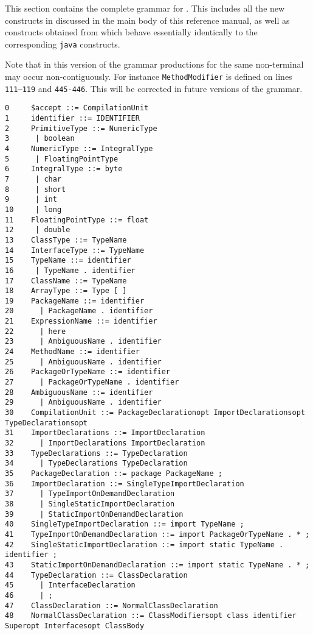 \onecolumn
{}\label{X10 syntax}

This section contains the complete grammar for \Xten{}. This includes
all the new constructs in \Xten{} discussed in the main body of this
reference manual, as well as constructs obtained from \java{} which
behave essentially identically to the corresponding {\tt java} constructs.

Note that in this version of the grammar productions for the same
non-terminal may occur non-contiguously. For instance 
{\tt MethodModifier} is defined on lines {\tt 111--119} and
{\tt 445-446}. This will be corrected in future versions of the grammar.

{\footnotesize
\begin{verbatim}
0     $accept ::= CompilationUnit
1     identifier ::= IDENTIFIER
2     PrimitiveType ::= NumericType
3      | boolean
4     NumericType ::= IntegralType
5      | FloatingPointType
6     IntegralType ::= byte
7      | char
8      | short
9      | int
10     | long
11    FloatingPointType ::= float
12     | double
13    ClassType ::= TypeName
14    InterfaceType ::= TypeName
15    TypeName ::= identifier
16     | TypeName . identifier
17    ClassName ::= TypeName
18    ArrayType ::= Type [ ]
19    PackageName ::= identifier
20      | PackageName . identifier
21    ExpressionName ::= identifier
22      | here
23      | AmbiguousName . identifier
24    MethodName ::= identifier
25      | AmbiguousName . identifier
26    PackageOrTypeName ::= identifier
27      | PackageOrTypeName . identifier
28    AmbiguousName ::= identifier
29      | AmbiguousName . identifier
30    CompilationUnit ::= PackageDeclarationopt ImportDeclarationsopt TypeDeclarationsopt
31    ImportDeclarations ::= ImportDeclaration
32      | ImportDeclarations ImportDeclaration
33    TypeDeclarations ::= TypeDeclaration
34      | TypeDeclarations TypeDeclaration
35    PackageDeclaration ::= package PackageName ;
36    ImportDeclaration ::= SingleTypeImportDeclaration
37      | TypeImportOnDemandDeclaration
38      | SingleStaticImportDeclaration
39      | StaticImportOnDemandDeclaration
40    SingleTypeImportDeclaration ::= import TypeName ;
41    TypeImportOnDemandDeclaration ::= import PackageOrTypeName . * ;
42    SingleStaticImportDeclaration ::= import static TypeName . identifier ;
43    StaticImportOnDemandDeclaration ::= import static TypeName . * ;
44    TypeDeclaration ::= ClassDeclaration
45      | InterfaceDeclaration
46      | ;
47    ClassDeclaration ::= NormalClassDeclaration
48    NormalClassDeclaration ::= ClassModifiersopt class identifier Superopt Interfacesopt ClassBody

\end{verbatim}}
